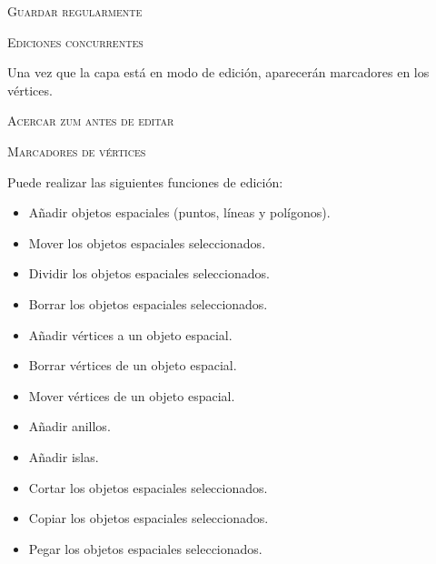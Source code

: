\begin{Tip}[h]\caption{\textsc{Guardar regularmente}}
\end{Tip}

\begin{Tip}[h]\caption{\textsc{Ediciones concurrentes}}
\end{Tip}

Una vez que la capa está en modo de edición, aparecerán marcadores en los vértices.

\begin{Tip}[h]\caption{\textsc{Acercar zum antes de editar}}
\end{Tip}

\begin{Tip}[h]\caption{\textsc{Marcadores de vértices}}
\end{Tip}

Puede realizar las siguientes funciones de edición:

\begin{itemize}
\item Añadir objetos espaciales (puntos, líneas y polígonos).
\item Mover los objetos espaciales seleccionados.
\item Dividir los objetos espaciales seleccionados.
\item Borrar los objetos espaciales seleccionados.
\item Añadir vértices a un objeto espacial.
\item Borrar vértices de un objeto espacial.
\item Mover vértices de un objeto espacial.
\item Añadir anillos.
\item Añadir islas.
\item Cortar los objetos espaciales seleccionados.
\item Copiar los objetos espaciales seleccionados.
\item Pegar los objetos espaciales seleccionados.
\end{itemize}

